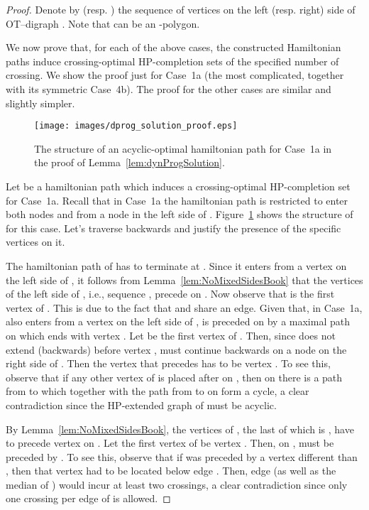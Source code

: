 \documentclass{myllncs-mixalis}
\begin{document}
\begin{proof}
Denote by  (resp. ) the sequence of vertices on the left
(resp. right) side of OT--digraph . Note that  can be an
-polygon.

We now prove that, for each of the above cases, the  constructed
Hamiltonian paths  induce  crossing-optimal HP-completion sets of
the specified number of crossing. We show the proof just for Case~1a
(the most complicated, together with its symmetric Case~4b). The
proof for the other cases are similar and slightly simpler.

\begin{figure}[htb]
    \centering
    \texttt{[image: images/dprog\_solution\_proof.eps]}
    \caption{The structure of an acyclic-optimal hamiltonian path for Case~1a in the proof
    of Lemma~\ref{lem:dynProgSolution}.}
    \label{fig:dynProgSolutionProof}
\end{figure}

Let  be a hamiltonian path which induces a
crossing-optimal HP-completion set for Case~1a. Recall that in
Case~1a the hamiltonian path is restricted to enter both nodes 
and  from a node in the left side of .
Figure~\ref{fig:dynProgSolutionProof} shows the structure of
  for this case. Let's traverse 
backwards and justify the presence of the specific vertices on it.

The hamiltonian path  of  has to
terminate at . Since it enters  from a vertex on
the left side of , it follows from
Lemma~\ref{lem:NoMixedSidesBook} that the vertices of the left side
of , i.e., sequence , precede  on
. Now observe that  is the first vertex of
. This is due to the fact that  and  share
an edge. Given that, in Case~1a,  also enters
 from a vertex  on the left side of ,  is preceded
on  by a maximal path  on  which ends
with vertex . Let  be the first vertex of . Then, since
 does not extend (backwards) before vertex ,
 must continue backwards on a node on the right
side  of . Then the vertex that precedes  has to be
vertex . To see this, observe that if any other vertex   of
 is placed after  on , then on
 there is  a path from  to  which together
with the path from  to  on  form a cycle, a clear
contradiction since the HP-extended graph of  must be acyclic.

By Lemma~\ref{lem:NoMixedSidesBook}, the vertices of ,
the last of which is , have to precede vertex  on
. Let the first vertex of  be vertex
. Then, on ,  must be preceded by .
To see this, observe that if  was preceded by  a vertex different
than , then that vertex had to be located below edge
. Then, edge  (as well as the median
of ) would incur  at least two crossings, a clear
contradiction since  only one crossing per edge of  is allowed.


\end{proof}
\end{document}
